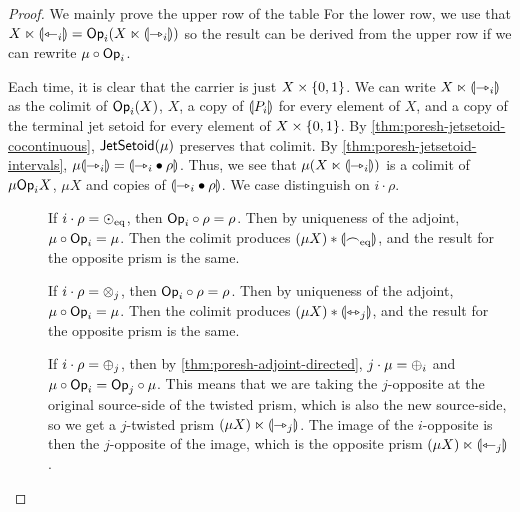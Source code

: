\documentclass[a4paper]{memoir}
\begin{document}
\begin{proof}
	We mainly prove the upper row of the table
	For the lower row, we use that $X \ltimes {\llparenthesis {\leftarrowtriangle}_i \rrparenthesis} = {\mathsf{Op}}_i(X \ltimes {\llparenthesis {\rightarrowtriangle}_i \rrparenthesis})$ so the result can be derived from the upper row if we can rewrite $\mu \circ {\mathsf{Op}}_i$.
	
	Each time, it is clear that the carrier is just $X \times \mathopen{}\left\{ 0, 1 \right\}\mathclose{}$.
	We can write $X \ltimes {\llparenthesis {\rightarrowtriangle}_i \rrparenthesis}$ as the colimit of ${\mathsf{Op}}_i(X)$, $X$, a copy of ${\llparenthesis P_i \rrparenthesis}$ for every element of $X$, and a copy of the terminal jet setoid for every element of $X \times \mathopen{}\left\{ 0, 1 \right\}\mathclose{}$.
	By \cref{thm:poresh-jetsetoid-cocontinuous}, $\mathsf{JetSetoid}(\mu)$ preserves that colimit.
	By \cref{thm:poresh-jetsetoid-intervals}, $\mu {\llparenthesis {\rightarrowtriangle}_i \rrparenthesis} = {\llparenthesis {\rightarrowtriangle}_i \mathbin{\bullet} \rho \rrparenthesis}$.
	Thus, we see that $\mu (X \ltimes {\llparenthesis {\rightarrowtriangle}_i \rrparenthesis})$ is a colimit of $\mu {\mathsf{Op}}_i X$, $\mu X$ and copies of ${\llparenthesis {\rightarrowtriangle}_i \mathbin{\bullet} \rho \rrparenthesis}$.
	We case distinguish on $i \cdot \rho$.
	\begin{description}
		\item[\framebox{$\nonpol_\eqtydeg$}] If $i \cdot \rho = {\odot}_{\mathrm{eq}}$, then ${\mathsf{Op}}_i \circ \rho = \rho$.
		Then by uniqueness of the adjoint, $\mu \circ {\mathsf{Op}}_i = \mu$.
		Then the colimit produces $(\mu X) * {\llparenthesis {\frown}_{\mathrm{eq}} \rrparenthesis}$, and the result for the opposite prism is the same.
%		
		
		\item[] If $i \cdot \rho = {\otimes}_j$, then ${\mathsf{Op}}_i \circ \rho = \rho$.
		Then by uniqueness of the adjoint, $\mu \circ {\mathsf{Op}}_i = \mu$.
		Then the colimit produces $(\mu X) * {\llparenthesis {\leftrightarrowtriangle}_j \rrparenthesis}$, and the result for the opposite prism is the same.
		
		\item[] If $i \cdot \rho = {\oplus}_j$, then by \cref{thm:poresh-adjoint-directed}, $j \cdot \mu = {\oplus}_i$ and $\mu \circ {\mathsf{Op}}_i = {\mathsf{Op}}_j \circ \mu$.
		This means that we are taking the $j$-opposite at the original source-side of the twisted prism, which is also the new source-side, so we get a $j$-twisted prism $(\mu X) \ltimes {\llparenthesis {\rightarrowtriangle}_j \rrparenthesis}$.
		The image of the $i$-opposite is then the $j$-opposite of the image, which is the opposite prism $(\mu X) \ltimes {\llparenthesis {\leftarrowtriangle}_j \rrparenthesis}$.
		

\end{description}
\end{proof}
\end{document}
